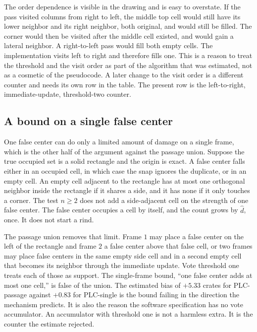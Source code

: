 The order dependence is visible in the drawing and is easy to overstate. If the pass visited columns from right to left, the middle top cell would still have its lower neighbor and its right neighbor, both original, and would still be filled. The corner would then be visited after the middle cell existed, and would gain a lateral neighbor. A right-to-left pass would fill both empty cells. The implementation visits left to right and therefore fills one. This is a reason to treat the threshold and the visit order as part of the algorithm that was estimated, not as a cosmetic of the pseudocode. A later change to the visit order is a different counter and needs its own row in the table. The present row is the left-to-right, immediate-update, threshold-two counter.

\subsection{A bound on a single false center}
\label{sec:false-center}

One false center can do only a limited amount of damage on a single frame, which is the other half of the argument against the passage union. Suppose the true occupied set is a solid rectangle and the origin is exact. A false center falls either in an occupied cell, in which case the snap ignores the duplicate, or in an empty cell. An empty cell adjacent to the rectangle has at most one orthogonal neighbor inside the rectangle if it shares a side, and it has none if it only touches a corner. The test $n\ge 2$ does not add a side-adjacent cell on the strength of one false center. The false center occupies a cell by itself, and the count grows by $\hat{d}$, once. It does not start a rind.

The passage union removes that limit. Frame $1$ may place a false center on the left of the rectangle and frame $2$ a false center above that false cell, or two frames may place false centers in the same empty side cell and in a second empty cell that becomes its neighbor through the immediate update. Vote threshold one treats each of those as support. The single-frame bound, ``one false center adds at most one cell,'' is false of the union. The estimated bias of $+5.33$ crates for PLC-passage against $+0.83$ for PLC-single is the bound failing in the direction the mechanism predicts. It is also the reason the software specification has no vote accumulator. An accumulator with threshold one is not a harmless extra. It is the counter the estimate rejected.

